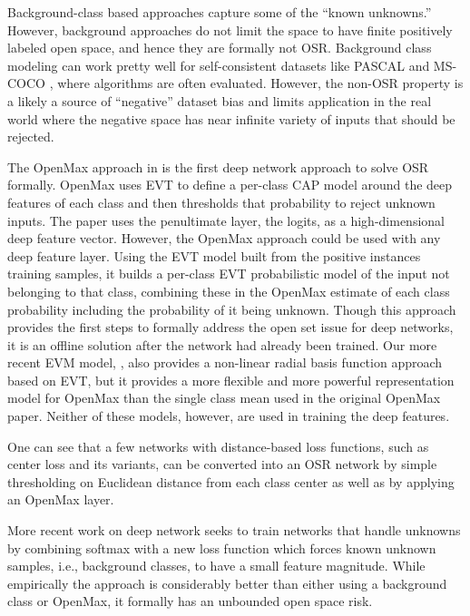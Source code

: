 \documentclass[letterpaper]{article}
\begin{document}
Background-class based approaches capture some of the ``known unknowns.” However, background approaches  do not limit the space to have finite positively labeled open space, and hence  they are formally not OSR.
Background class modeling can work pretty well for self-consistent  datasets like PASCAL  \cite{everingham2010pascal} and  MS-COCO  \cite{lin2014microsoft}, where  algorithms are often evaluated. However,  the non-OSR property is a likely a source of ``negative” dataset bias  \cite{tommasi2017deeper} and limits application in the real world where the negative space has near infinite variety of inputs that should be rejected.





The OpenMax approach in  \cite{bendale2016openmax} is the first deep network approach to solve OSR formally.
OpenMax uses EVT to define a per-class CAP model around the deep features of each class and then thresholds that probability to reject unknown inputs.
The paper uses the penultimate layer, the logits, as a high-dimensional
deep feature vector. However, the OpenMax approach could be used with any deep feature layer.
Using the EVT model built from the positive instances training samples, it builds a per-class EVT probabilistic model of the input not belonging to that class, combining these in the OpenMax estimate of each class probability including the probability of it being unknown.
Though this approach provides the first steps to formally address the
open set issue for deep networks, it is an offline solution after the
network had already been trained.  Our more recent EVM model,
 \cite{rudd2018extreme},  also provides a non-linear radial basis
function approach based on EVT, but it provides a more flexible and
more powerful representation model for OpenMax than the single class
mean used in the original OpenMax paper. Neither of these models,
however, are used in training the deep features. 


One can see that a few networks with distance-based loss functions, such as center loss  \cite{wen2016discriminative} and its variants, can be converted into an OSR network by simple thresholding on Euclidean distance from each class center as well as by applying an OpenMax layer. 


More recent work on deep network  \cite{Dhamija_NIPS18} seeks to train networks that handle unknowns by combining softmax with a new loss function which forces known unknown samples, i.e., background classes, to have a small feature magnitude.
While empirically the approach is considerably better than either using a background class or OpenMax, it formally has an unbounded open space risk.
\end{document}
